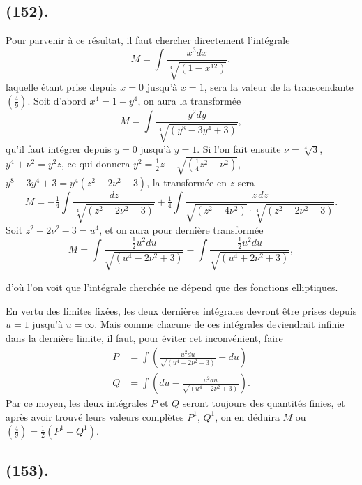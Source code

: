 \documentclass{article}
\begin{document}
\subsection*{(152).}

Pour parvenir à ce résultat, il faut chercher directement l'intégrale
\[ M=\int\frac{x^{3}dx}{\sqrt[4]{(1-x^{12})}}, \]
laquelle étant prise depuis $x=0$ jusqu'à $x=1$, sera la valeur de la transcendante $\left(\frac{4}{9}\right)$. Soit d'abord $x^{4}=1-y^{4}$, on aura la transformée
\[ M=\int\frac{y^{2}dy}{\sqrt[4]{(y^{8}-3y^{4}+3)}}, \]
qu'il faut intégrer depuis $y=0$ jusqu'à $y=1$. Si l'on fait ensuite $\nu=\sqrt[4]{3}$, $y^{4}+\nu^{2}=y^{2}z$, ce qui donnera $y^{2}=\frac{1}{2}z-\sqrt{(\frac{1}{4}z^{2}-\nu^{2})}$, $y^{8}-3y^{4}+3=y^{4}(z^{2}-2\nu^{2}-3)$, la transformée en $z$ sera
\[ M=-\tfrac{1}{4}\int\frac{dz}{\sqrt[4]{(z^{2}-2\nu^{2}-3)}}+\tfrac{1}{4}\int\frac{z\,dz}{\sqrt{(z^{2}-4\nu^{2})}\cdot\sqrt[4]{(z^{2}-2\nu^{2}-3)}}. \]
Soit $z^{2}-2\nu^{2}-3=u^{4}$, et on aura pour dernière transformée
\[ M=\int\frac{\tfrac{1}{2}u^{2}du}{\sqrt{(u^{4}-2\nu^{2}+3)}}-\int\frac{\tfrac{1}{2}u^{2}du}{\sqrt{(u^{4}+2\nu^{2}+3)}}, \]

d'où l'on voit que l'intégrale cherchée ne dépend que des fonctions elliptiques.

En vertu des limites fixées, les deux dernières intégrales devront être prises depuis $u=1$ jusqu'à $u=\infty$. Mais comme chacune de ces intégrales deviendrait infinie dans la dernière limite, il faut, pour éviter cet inconvénient, faire
\[ \begin{aligned} P&=\int\left(\frac{u^{2}du}{\sqrt{(u^{4}-2\nu^{2}+3)}}-du\right)\\ Q&=\int\left(du-\frac{u^{2}du}{\sqrt{(u^{4}+2\nu^{2}+3)}}\right). \end{aligned} \]
Par ce moyen, les deux intégrales $P$ et $Q$ seront toujours des quantités finies, et après avoir trouvé leurs valeurs complètes $P^{1}$, $Q^{1}$, on en déduira $M$ ou $\left(\frac{4}{9}\right)=\frac{1}{2}(P^{1}+Q^{1})$.

\subsection*{(153).}
\end{document}
